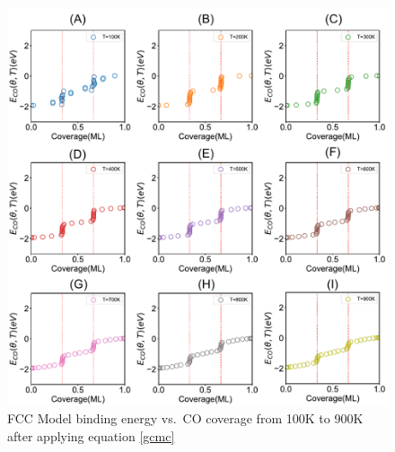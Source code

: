 \documentclass[11pt]{article}
\begin{document}
\clearpage
\begin{figure} [h]
\centering
\includegraphics[width=15cm]{Figure/1E-T.pdf}
\caption{FCC Model binding energy vs.\ CO coverage from 100K to 900K after applying equation \ref{gcmc}}
\label{1E}
\end{figure}
\clearpage
\end{document}
